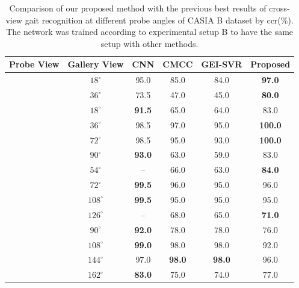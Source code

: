 \begin{table}
	\centering
	\caption[Comparison of our proposed method with the previous best results of cross-view gait recognition ]
	{Comparison of our proposed method with the previous best results of cross-view gait recognition at different probe angles of CASIA B dataset by \gls{ccr}(\%). The network was trained according to experimental setup B to have the same setup with other methods. \label{table:comp_casia_b_cross_view}}
	
	{\begin{tabular*}{29pc}{c|c|cccc}\hline  \rule{0pt}{2ex}
	Probe View &Gallery View &CNN &CMCC &GEI-SVR  &\textbf{Proposed} \\ \hline\rule{0pt}{3ex}
	
	\multirow{2}{*}{$0^{\circ}$} &$18^{\circ}$ &95.0 &85.0 &84.0 &\textbf{97.0} \\\rule{0pt}{2ex}
	
					&$36^{\circ}$ &73.5 &47.0 &45.0 &\textbf{80.0} \\ \hline\rule{0pt}{3ex}
	
	
	\multirow{4}{*}{$54^{\circ}$} &$18^{\circ}$ &\textbf{91.5} &65.0 &64.0  &83.0 \\\rule{0pt}{2ex}
	
			&$36^{\circ}$ &98.5 &97.0 &95.0 &\textbf{100.0} \\\rule{0pt}{2ex}
	
			&$72^{\circ}$ &98.5 &95.0 &93.0 &\textbf{100.0} \\\rule{0pt}{2ex}
	
			&$90^{\circ}$ &\textbf{93.0} &63.0 &59.0 &83.0 \\\hline\rule{0pt}{3ex}
	
	
	\multirow{4}{*}{$90^{\circ}$} &$54^{\circ}$ &-- &66.0 &63.0 &\textbf{84.0 }\\\rule{0pt}{2ex}
	
		&$72^{\circ}$ &\textbf{99.5} &96.0 &95.0 &96.0 \\ \rule{0pt}{2ex}
	
		&$108^{\circ}$ &\textbf{99.5} &95.0 &95.0 &95.0 \\ \rule{0pt}{2ex}
	
		&$126^{\circ}$ &-- &68.0 &65.0 &\textbf{71.0} \\\hline\rule{0pt}{3ex}
	
	
	\multirow{4}{*}{$126^{\circ}$} &$90^{\circ}$ &\textbf{92.0} &78.0 &78.0 &76.0 \\\rule{0pt}{2ex}
			&$108^{\circ}$ &\textbf{99.0} &98.0 &98.0 &92.0 \\\rule{0pt}{2ex}
			&$144^{\circ}$ &97.0 &\textbf{98.0} &\textbf{98.0} &96.0 \\\rule{0pt}{2ex}
			&$162^{\circ}$ &\textbf{83.0} &75.0 &74.0 &77.0 \\\hline
	\end{tabular*}}{} 
\end{table}

